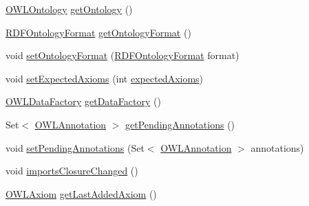 \begin{DoxyCompactItemize}
\hyperlink{interfaceorg_1_1semanticweb_1_1owlapi_1_1model_1_1_o_w_l_ontology}{O\-W\-L\-Ontology} \hyperlink{classorg_1_1coode_1_1owlapi_1_1rdfxml_1_1parser_1_1_o_w_l_r_d_f_consumer_a1fd4c6c12575b1487b4bf3775496cac7}{get\-Ontology} ()
\item 
\hyperlink{classorg_1_1semanticweb_1_1owlapi_1_1io_1_1_r_d_f_ontology_format}{R\-D\-F\-Ontology\-Format} \hyperlink{classorg_1_1coode_1_1owlapi_1_1rdfxml_1_1parser_1_1_o_w_l_r_d_f_consumer_a5ae8a0b19c110ce99dedccd540ba0451}{get\-Ontology\-Format} ()
\item 
void \hyperlink{classorg_1_1coode_1_1owlapi_1_1rdfxml_1_1parser_1_1_o_w_l_r_d_f_consumer_a6bac54306b1c6f52c612b97e73fc2b86}{set\-Ontology\-Format} (\hyperlink{classorg_1_1semanticweb_1_1owlapi_1_1io_1_1_r_d_f_ontology_format}{R\-D\-F\-Ontology\-Format} format)
\item 
void \hyperlink{classorg_1_1coode_1_1owlapi_1_1rdfxml_1_1parser_1_1_o_w_l_r_d_f_consumer_a857bee6b7ca100a0d3356f5127c26b50}{set\-Expected\-Axioms} (int \hyperlink{classorg_1_1coode_1_1owlapi_1_1rdfxml_1_1parser_1_1_o_w_l_r_d_f_consumer_aa9d688cc3e8bbdddeb37c3c819f70735}{expected\-Axioms})
\item 
\hyperlink{interfaceorg_1_1semanticweb_1_1owlapi_1_1model_1_1_o_w_l_data_factory}{O\-W\-L\-Data\-Factory} \hyperlink{classorg_1_1coode_1_1owlapi_1_1rdfxml_1_1parser_1_1_o_w_l_r_d_f_consumer_ad207b3dac957e47b6d783430f69d075c}{get\-Data\-Factory} ()
\item 
Set$<$ \hyperlink{interfaceorg_1_1semanticweb_1_1owlapi_1_1model_1_1_o_w_l_annotation}{O\-W\-L\-Annotation} $>$ \hyperlink{classorg_1_1coode_1_1owlapi_1_1rdfxml_1_1parser_1_1_o_w_l_r_d_f_consumer_a62ece6c4d2211abaadf46707cc98104e}{get\-Pending\-Annotations} ()
\item 
void \hyperlink{classorg_1_1coode_1_1owlapi_1_1rdfxml_1_1parser_1_1_o_w_l_r_d_f_consumer_a7e85f58ca9f1cfe29108494290d5be3f}{set\-Pending\-Annotations} (Set$<$ \hyperlink{interfaceorg_1_1semanticweb_1_1owlapi_1_1model_1_1_o_w_l_annotation}{O\-W\-L\-Annotation} $>$ annotations)
\item 
void \hyperlink{classorg_1_1coode_1_1owlapi_1_1rdfxml_1_1parser_1_1_o_w_l_r_d_f_consumer_a335e0da20b7d9c46d34dd650f32c27f3}{imports\-Closure\-Changed} ()
\item 
\hyperlink{interfaceorg_1_1semanticweb_1_1owlapi_1_1model_1_1_o_w_l_axiom}{O\-W\-L\-Axiom} \hyperlink{classorg_1_1coode_1_1owlapi_1_1rdfxml_1_1parser_1_1_o_w_l_r_d_f_consumer_a0006ba4d97d6761d98425b3068931b9b}{get\-Last\-Added\-Axiom} ()
\item 

\end{DoxyCompactItemize}
